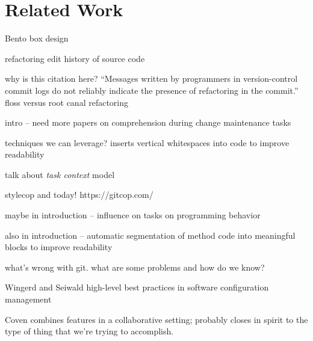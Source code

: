 \documentclass[conference]{IEEEtran}
\begin{document}







\section{Related Work}

Bento box design~\cite{DeLine2010a}

refactoring edit history of source code~\cite{Hayashi2012}

why is this citation here? ``Messages written by programmers in version-control commit logs do not reliably indicate the presence of refactoring in the commit.''
floss versus root canal refactoring~\cite{Murphy-Hill2012c}

intro -- need more papers on comprehension during change maintenance tasks

techniques we can leverage?
inserts vertical whitespaces into code to improve readability~\cite{Wang2011}


talk about \emph{task context} model

stylecop
and today! https://gitcop.com/


maybe in introduction -- influence on tasks on programming behavior~\cite{Ying2011a}

also in introduction -- automatic segmentation of method code into
meaningful blocks to improve readability 

what's wrong with git. what are some problems and how do we know?~\cite{PerezDeRosso2013}

Wingerd and Seiwald
high-level best practices in software configuration management~\cite{Wingerd1998}

Coven combines features in a collaborative setting; probably closes in spirit to the type of thing that we're trying to accomplish.~\cite{Chu-Carroll2000}
\end{document}
